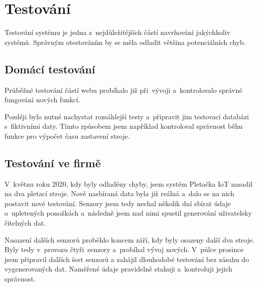 \chapter{Testování}
Testování systému je jedna z~nejdůležitějších částí navrhování jakýchkoliv systémů.
Správným otestováním by se měla odladit většina potenciálních chyb.



\section{Domácí testování}
Průběžné testování částí webu probíhalo již při~vývoji a~kontrolovalo správné fungování nových funkcí.

Později bylo nutné nachystat rozsáhlejší testy a~připravit jim testovací databázi s~fiktivními daty.
Tímto způsobem jsem například kontroloval správnost běhu funkce pro výpočet času zastavení stroje.


\section{Testování ve firmě}
V~květnu roku 2020, kdy byly odladěny chyby, jsem systém Pletačka IoT nasadil na dva pletací stroje.
Nově nasbíraná data byla již reálná a~dalo se na nich postavit nové testování.
Senzory jsem tedy nechal několik dní sbírat údaje o~upletených ponožkách a~následně jsem nad nimi spustil generování uživatelsky čitelných dat.

Nasazení dalších senzorů proběhlo koncem září, kdy byly osazeny další dva stroje. Byly tedy v provozu čtyři senzory a probíhal vývoj nových.
V půlce prosince jsem připravil dalších šest senzorů a zahájil dlouhodobé testování bez zásahu do vygenerovaných dat. Naměřené údaje pravidelně stahuji a kontroluji jejich správnost.

\newpage